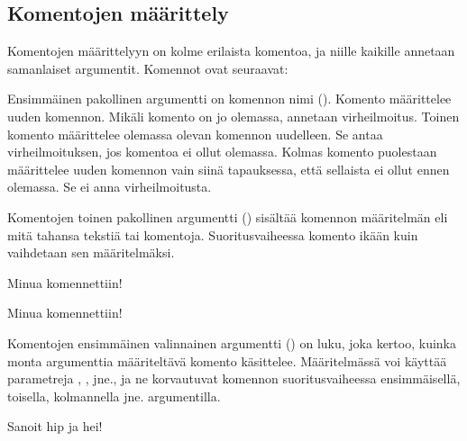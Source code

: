 \subsection{Komentojen määrittely}
\label{luku:komennot-määr}

Komentojen määrittelyyn on kolme erilaista komentoa, ja niille kaikille
annetaan samanlaiset argumentit. Komennot ovat seuraavat:

\begin{koodilohkosis}
  \newcommand     {\nimi}[n][oletus]{määritelmä}
  \renewcommand   {\nimi}[n][oletus]{määritelmä}
  \providecommand {\nimi}[n][oletus]{määritelmä}
\end{koodilohkosis}

Ensimmäinen pakollinen argumentti on komennon nimi (). Komento  määrittelee uuden komennon.
Mikäli komento on jo olemassa, annetaan virheilmoitus. Toinen komento
 määrittelee olemassa olevan komennon
uudelleen. Se antaa virheilmoituksen, jos komentoa ei ollut olemassa.
Kolmas komento  puolestaan määrittelee
uuden komennon vain siinä tapauksessa, että sellaista ei ollut ennen
olemassa. Se ei anna virheilmoitusta.

Komentojen toinen pakollinen argumentti ()
sisältää komennon määritelmän eli mitä tahansa tekstiä tai komentoja.
Suoritusvaiheessa komento ikään kuin vaihdetaan sen määritelmäksi.

\pagebreak[3]

\begin{koodilohkosis}
  \newcommand{\komento}{Minua komennettiin!}
  \komento
\end{koodilohkosis}

\begin{tulossis}
  Minua komennettiin!
\end{tulossis}

Komentojen ensimmäinen valinnainen argumentti () on luku, joka
kertoo, kuinka monta argumenttia määriteltävä komento käsittelee.
Määritelmässä voi käyttää parametreja , ,
 jne., ja ne korvautuvat komennon suoritusvaiheessa
ensimmäisellä, toisella, kolmannella jne. argumentilla.

\pagebreak[3]

\begin{koodilohkosis}
  \newcommand{\komento}[2]{Sanoit #1 ja #2!}
  \komento{hip}{hei}
\end{koodilohkosis}

